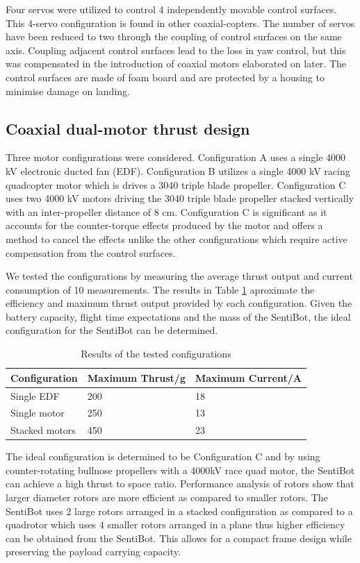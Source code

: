 \documentclass[12pt]{article}
\begin{document}
Four servos were utilized to control 4 independently movable control surfaces. This 4-servo configuration is found in other coaxial-copters\cite{SFV}. The number of servos have been reduced to two through the coupling of control surfaces on the same axis. Coupling adjacent control surfaces lead to the loss in yaw control, but this was compensated in the introduction of coaxial motors elaborated on later. The control surfaces are made of foam board and are protected by a housing to minimise damage on landing. 

\subsection{Coaxial dual-motor thrust design}

Three motor configurations were considered. Configuration A uses a single 4000 kV electronic ducted fan (EDF).  Configuration B utilizes a single 4000 kV racing quadcopter motor which is drives a 3040 triple blade propeller. Configuration C uses two 4000 kV motors driving the 3040 triple blade propeller stacked vertically with an inter-propeller distance of 8 cm. Configuration C is significant as it accounts for the counter-torque effects produced by the motor and offers a method to cancel the effects unlike the other configurations which require active compensation from the control surfaces.

We tested the configurations by measuring the average thrust output and current consumption of 10 measurements. The results in Table \ref{tab:configs} aproximate the efficiency and maximum thrust output provided by each configuration. Given the battery capacity, flight time expectations and the mass of the SentiBot, the ideal configuration for the SentiBot can be determined.

\begin{table}[h]
	\centering
	\begin{tabular}{ | l | l | l | }
		Configuration & Maximum Thrust/g & Maximum Current/A \\
		\hline
		Single EDF & 200 & 18 \\
		Single motor & 250 & 13 \\
		Stacked motors & 450 & 23 \\
	\end{tabular}
	\caption{Results of the tested configurations}
	\label{tab:configs}
\end{table}

The ideal configuration is determined to be Configuration C and by using counter-rotating bullnose propellers with a 4000kV race quad motor, the SentiBot can achieve a high thrust to space ratio. Performance analysis of rotors show that larger diameter rotors are more efficient as compared to smaller rotors\cite{propellor}. The SentiBot uses 2 large rotors arranged in a stacked configuration as compared to a quadrotor which uses 4 smaller rotors arranged in a plane thus higher efficiency can be obtained from the SentiBot\cite{propellor}. This allows for a compact frame design while preserving the payload carrying capacity.
\end{document}
